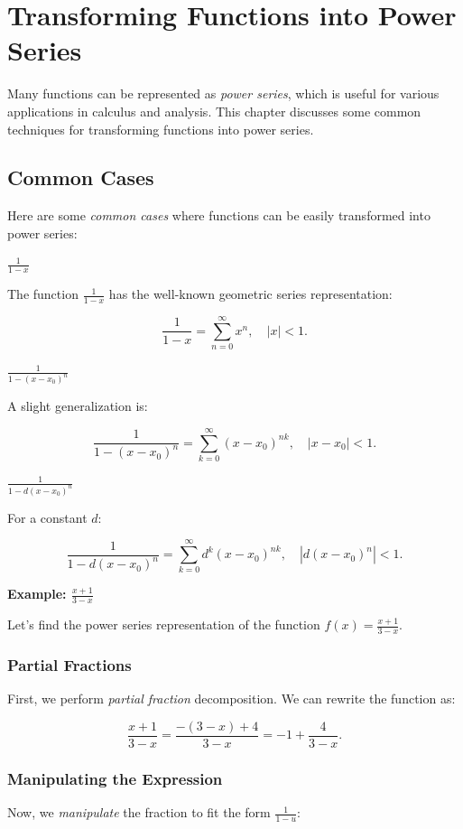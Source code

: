\chapter{Transforming Functions into Power Series}

Many functions can be represented as \emph{power series}, which is useful for various applications in calculus 
and analysis. This chapter discusses some common techniques for transforming functions into power series.

\section{Common Cases}

Here are some \emph{common cases} where functions can be easily transformed into power series:

\(\frac{1}{1 - x}\)

The function \(\frac{1}{1 - x}\) has the well-known geometric series representation:

\[
    \frac{1}{1 - x} = \sum_{n=0}^{\infty} x^n, \quad |x| < 1.
\]

\(\frac{1}{1 - {(x - x_0)}^n}\)

A slight generalization is:

\[
    \frac{1}{1 - {(x - x_0)}^n} = \sum_{k=0}^{\infty} {(x - x_0)}^{nk}, \quad |x - x_0| < 1.
\]

\(\frac{1}{1 - d{(x - x_0)}^n}\)

For a constant \(d\):

\[
    \frac{1}{1 - d{(x - x_0)}^n} = \sum_{k=0}^{\infty} d^k {(x - x_0)}^{nk}, \quad |d{(x - x_0)}^n| < 1.
\]

\textbf{Example: \(\frac{x + 1}{3 - x}\)}

Let's find the power series representation of the function \(f(x) = \frac{x + 1}{3 - x}\).

\subsection{Partial Fractions}

First, we perform \emph{partial fraction} decomposition. We can rewrite the function as:

\[
    \frac{x + 1}{3 - x} = \frac{-(3 - x) + 4}{3 - x} = -1 + \frac{4}{3 - x}.
\]

\subsection{Manipulating the Expression}
Now, we \emph{manipulate} the fraction to fit the form \(\frac{1}{1 - u}\):

